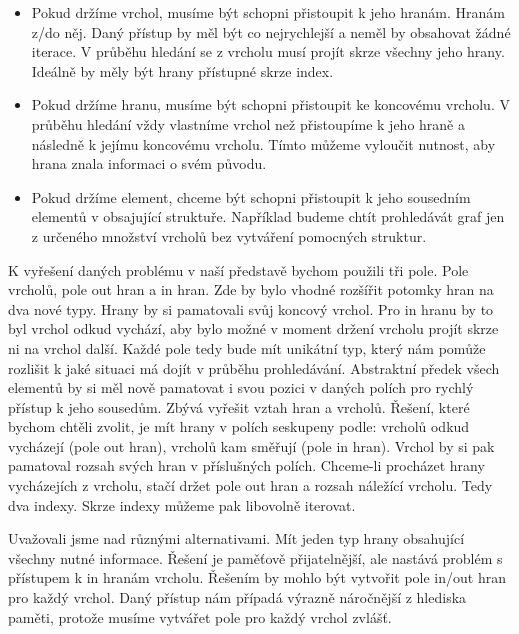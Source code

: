 \begin{itemize}

\item Pokud držíme vrchol, musíme být schopni přistoupit k jeho hranám. Hranám z/do něj. Daný přístup by měl být co nejrychlejší a neměl by obsahovat žádné iterace. V průběhu hledání se z vrcholu musí projít skrze všechny jeho hrany. Ideálně by měly být hrany přístupné skrze index.

\item Pokud držíme hranu, musíme být schopni přistoupit ke koncovému vrcholu. V průběhu hledání vždy vlastníme vrchol než přistoupíme k jeho hraně a následně k jejímu koncovému vrcholu. Tímto můžeme vyloučit nutnost, aby hrana znala informaci o svém původu.

\item Pokud držíme element, chceme být schopni přistoupit k jeho sousedním elementů v obsajující struktuře. Například budeme chtít prohledávát graf jen z určeného množství vrcholů bez vytváření pomocných struktur.

\end{itemize}

K vyřešení daných problému v naší představě bychom použili tři pole.
Pole vrcholů, pole out hran a in hran. 
Zde by bylo vhodné rozšířit potomky hran na dva nové typy.
Hrany by si pamatovali svůj koncový vrchol.
Pro in hranu by to byl vrchol odkud vychází, aby bylo možné v moment držení vrcholu projít skrze ni na vrchol další.
Každé pole tedy bude mít unikátní typ, který nám pomůže rozlišit k jaké situaci má dojít v průběhu prohledávání.
Abstraktní předek všech elementů by si měl nově pamatovat i svou pozici v daných polích pro rychlý přístup k jeho sousedům.
Zbývá vyřešit vztah hran a vrcholů.
Řešení, které bychom chtěli zvolit, je mít hrany v polích seskupeny podle: vrcholů odkud vycházejí (pole out hran), vrcholů kam směřují (pole in hran).
Vrchol by si pak pamatoval rozsah svých hran v příslušných polích. 
Chceme-li procházet hrany vycházejích z vrcholu, stačí držet pole out hran a rozsah náležící vrcholu. Tedy dva indexy.
Skrze indexy můžeme pak libovolně iterovat.

Uvažovali jsme nad různými alternativami. 
Mít jeden typ hrany obsahující všechny nutné informace.
Řešení je paměťově přijatelnější, ale nastává problém s přístupem k in hranám vrcholu.
Řešením by mohlo být vytvořit pole in/out hran pro každý vrchol. 
Daný přístup nám případá výrazně náročnější z hlediska paměti, protože musíme vytvářet pole pro každý vrchol zvlášť. 

